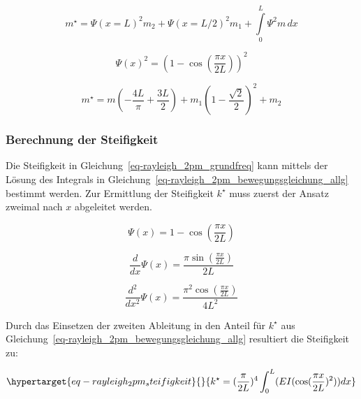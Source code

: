 \documentclass[
  letterpaper,
  DIV=11]{scrreprt}
\begin{document}
\begin{equation}m^{\star} = \Psi(x=L)^{2} m_{2} + \Psi(x=L/2)^{2} m_{1} + \int\limits_{0}^{L} \Psi^{2} m\, dx\end{equation}

\begin{equation}\Psi(x)^{2} = \left(1 - \cos{\left(\frac{\pi x}{2 L} \right)}\right)^{2}\end{equation}

\begin{equation}m^{\star} = m \left(- \frac{4 L}{\pi} + \frac{3 L}{2}\right) + m_{1} \left(1 - \frac{\sqrt{2}}{2}\right)^{2} + m_{2}\end{equation}

\hypertarget{berechnung-der-steifigkeit}{%
\subsubsection{Berechnung der
Steifigkeit}\label{berechnung-der-steifigkeit}}

Die Steifigkeit in Gleichung~\ref{eq-rayleigh_2pm_grundfreq} kann
mittels der Lösung des Integrals in
Gleichung~\ref{eq-rayleigh_2pm_bewegungsgleichung_allg} bestimmt werden.
Zur Ermittlung der Steifigkeit \(k^\star\) muss zuerst der Ansatz
zweimal nach \(x\) abgeleitet werden.

\begin{equation}\Psi{\left(x \right)} = 1 - \cos{\left(\frac{\pi x}{2 L} \right)}\end{equation}

\begin{equation}\frac{d}{d x} \Psi{\left(x \right)} = \frac{\pi \sin{\left(\frac{\pi x}{2 L} \right)}}{2 L}\end{equation}

\begin{equation}\frac{d^{2}}{d x^{2}} \Psi{\left(x \right)} = \frac{\pi^{2} \cos{\left(\frac{\pi x}{2 L} \right)}}{4 L^{2}}\end{equation}

Durch das Einsetzen der zweiten Ableitung in den Anteil für \(k^\star\)
aus Gleichung~\ref{eq-rayleigh_2pm_bewegungsgleichung_allg} resultiert
die Steifigkeit zu:

\begin{equation}\protect\hypertarget{eq-rayleigh_2pm_steifigkeit}{}{
k^\star = (\frac{\pi}{2L})^4 \int_0^L(EI(\cos(\frac{\pi x}{2L})^2)) dx
}\label{eq-rayleigh_2pm_steifigkeit}\end{equation}
\end{document}
